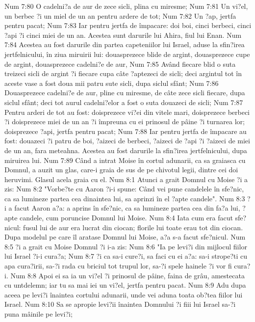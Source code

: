 Num 7:80  O cadelni?a de aur de zece sicli, plina cu miresme;
Num 7:81  Un vi?el, un berbec ?i un miel de un an pentru ardere de tot;
Num 7:82  Un ?ap, jertfa pentru pacat;
Num 7:83  Iar pentru jertfa de împacare: doi boi, cinci berbeci, cinci ?api ?i cinci miei de un an. Acestea sunt darurile lui Ahira, fiul lui Enan.
Num 7:84  Acestea au fost darurile din partea capeteniilor lui Israel, aduse la sfin?irea jertfelnicului, în ziua miruirii lui: douasprezece blide de argint, douasprezece cupe de argint, douasprezece cadelni?e de aur,
Num 7:85  Având fiecare blid o suta treizeci sicli de argint ?i fiecare cupa câte ?aptezeci de sicli; deci argintul tot în aceste vase a fost doua mii patru sute sicli, dupa siclul sfânt;
Num 7:86  Douasprezece cadelni?e de aur, pline cu miresme, de câte zece sicli fiecare, dupa siclul sfânt; deci tot aurul cadelni?elor a fost o suta douazeci de sicli;
Num 7:87  Pentru arderi de tot au fost: doisprezece vi?ei din vitele mari, doisprezece berbeci ?i doisprezece miei de un an ?i împreuna cu ei prinosul de pâine ?i turnarea lor; doisprezece ?api, jertfa pentru pacat;
Num 7:88  Iar pentru jertfa de împacare au fost: douazeci ?i patru de boi, ?aizeci de berbeci, ?aizeci de ?api ?i ?aizeci de miei de un an, fara meteahna. Acestea au fost darurile la sfin?irea jertfelnicului, dupa miruirea lui.
Num 7:89  Când a intrat Moise în cortul adunarii, ca sa graiasca cu Domnul, a auzit un glas, care-i graia de sus de pe chivotul legii, dintre cei doi heruvimi. Glasul acela graia cu el.
Num 8:1  Atunci a grait Domnul cu Moise ?i a zis:
Num 8:2  "Vorbe?te cu Aaron ?i-i spune: Când vei pune candelele în sfe?nic, ca sa lumineze partea cea dinaintea lui, sa aprinzi în el ?apte candele".
Num 8:3  ?i a facut Aaron a?a: a aprins în sfe?nic, ca sa lumineze partea cea din fa?a lui, ?apte candele, cum poruncise Domnul lui Moise.
Num 8:4  Iata cum era facut sfe?nicul: fusul lui de aur era lucrat din ciocan; florile lui toate erau tot din ciocan. Dupa modelul pe care îl aratase Domnul lui Moise, a?a s-a facut sfe?nicul.
Num 8:5  ?i a grait cu Moise Domnul ?i i-a zis:
Num 8:6  "Ia pe levi?i din mijlocul fiilor lui Israel ?i-i cura?a;
Num 8:7  ?i ca sa-i cure?i, sa faci cu ei a?a: sa-i strope?ti cu apa cura?irii, sa-?i rada cu briciul tot trupul lor, sa-?i spele hainele ?i vor fi cura?i.
Num 8:8  Apoi ei sa ia un vi?el ?i prinosul de pâine, faina de grâu, amestecata cu untdelemn; iar tu sa mai iei un vi?el, jertfa pentru pacat.
Num 8:9  Adu dupa aceea pe levi?i înaintea cortului adunarii, unde vei aduna toata ob?tea fiilor lui Israel.
Num 8:10  Sa se apropie levi?ii înaintea Domnului ?i fiii lui Israel sa-?i puna mâinile pe levi?i;
